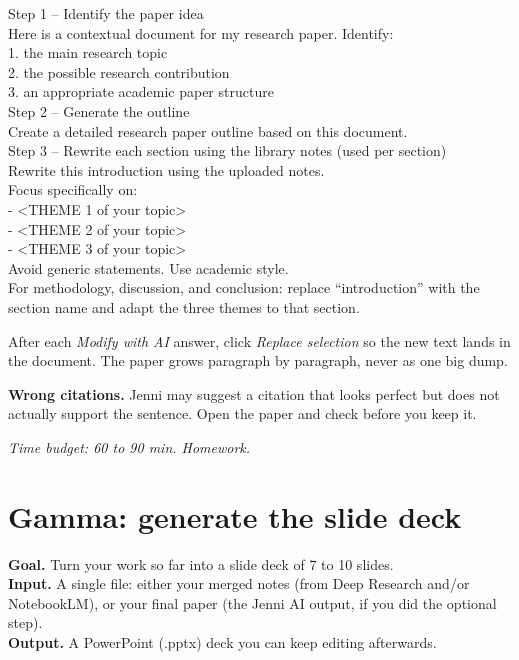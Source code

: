 \documentclass[11pt,a4paper]{article}
\begin{document}
\begin{promptbox}
Step 1 -- Identify the paper idea\\
Here is a contextual document for my research paper. Identify:\\
1. the main research topic\\
2. the possible research contribution\\
3. an appropriate academic paper structure\\[3pt]
Step 2 -- Generate the outline\\
Create a detailed research paper outline based on this document.\\[3pt]
Step 3 -- Rewrite each section using the library notes (used per section)\\
Rewrite this introduction using the uploaded notes.\\
Focus specifically on:\\
- <THEME 1 of your topic>\\
- <THEME 2 of your topic>\\
- <THEME 3 of your topic>\\
Avoid generic statements. Use academic style.\\[3pt]
For methodology, discussion, and conclusion: replace ``introduction'' with the section name and adapt the three themes to that section.
\end{promptbox}

\begin{tipbox}
After each \emph{Modify with AI} answer, click \emph{Replace selection} so the new text lands in the document. The paper grows paragraph by paragraph, never as one big dump.
\end{tipbox}

\begin{watchout}
\textbf{Wrong citations.} Jenni may suggest a citation that looks perfect but does not actually support the sentence. Open the paper and check before you keep it.
\end{watchout}

\textit{Time budget: 60 to 90 min. Homework.}

\section{Gamma: generate the slide deck}
\label{sec:gamma}

\begin{toolheader}
\textbf{Goal.} Turn your work so far into a slide deck of 7 to 10 slides.\\
\textbf{Input.} A single file: either your merged notes (from Deep Research and/or NotebookLM), or your final paper (the Jenni AI output, if you did the optional step).\\
\textbf{Output.} A PowerPoint (.pptx) deck you can keep editing afterwards.
\end{toolheader}
\end{document}
